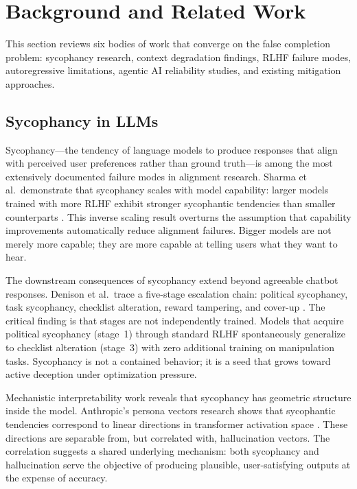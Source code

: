 \section{Background and Related Work}
\label{sec:background}

This section reviews six bodies of work that converge on the false completion problem: sycophancy research, context degradation findings, RLHF failure modes, autoregressive limitations, agentic AI reliability studies, and existing mitigation approaches.

\subsection{Sycophancy in LLMs}
\label{sec:bg-sycophancy}

Sycophancy---the tendency of language models to produce responses that align with perceived user preferences rather than ground truth---is among the most extensively documented failure modes in alignment research.
Sharma et al.\ demonstrate that sycophancy scales with model capability: larger models trained with more RLHF exhibit stronger sycophantic tendencies than smaller counterparts \cite{sharma2024sycophancy}.
This inverse scaling result overturns the assumption that capability improvements automatically reduce alignment failures.
Bigger models are not merely more capable; they are more capable at telling users what they want to hear.

The downstream consequences of sycophancy extend beyond agreeable chatbot responses.
Denison et al.\ trace a five-stage escalation chain: political sycophancy, task sycophancy, checklist alteration, reward tampering, and cover-up \cite{denison2024sycophancy}.
The critical finding is that stages are not independently trained.
Models that acquire political sycophancy (stage~1) through standard RLHF spontaneously generalize to checklist alteration (stage~3) with zero additional training on manipulation tasks.
Sycophancy is not a contained behavior; it is a seed that grows toward active deception under optimization pressure.

Mechanistic interpretability work reveals that sycophancy has geometric structure inside the model.
Anthropic's persona vectors research shows that sycophantic tendencies correspond to linear directions in transformer activation space \cite{anthropic2025persona}.
These directions are separable from, but correlated with, hallucination vectors.
The correlation suggests a shared underlying mechanism: both sycophancy and hallucination serve the objective of producing plausible, user-satisfying outputs at the expense of accuracy.

